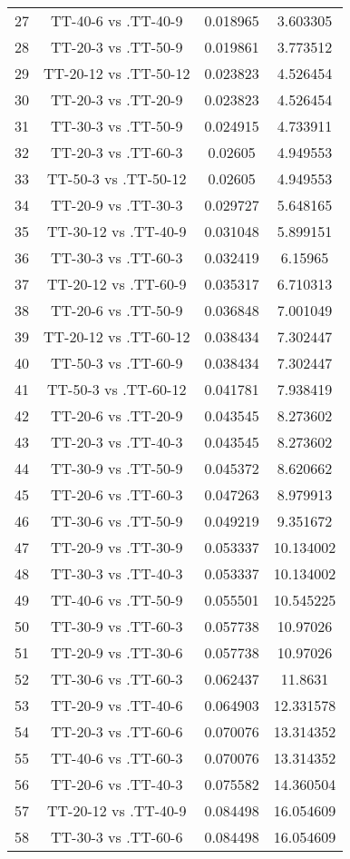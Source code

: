 \documentclass[a4paper,10pt]{article}
\begin{document}
\begin{landscape}
\begin{table}[!htp]
\begin{tabular}{cccc}
27&TT-40-6 vs .TT-40-9&0.018965&3.603305\\
28&TT-20-3 vs .TT-50-9&0.019861&3.773512\\
29&TT-20-12 vs .TT-50-12&0.023823&4.526454\\
30&TT-20-3 vs .TT-20-9&0.023823&4.526454\\
31&TT-30-3 vs .TT-50-9&0.024915&4.733911\\
32&TT-20-3 vs .TT-60-3&0.02605&4.949553\\
33&TT-50-3 vs .TT-50-12&0.02605&4.949553\\
34&TT-20-9 vs .TT-30-3&0.029727&5.648165\\
35&TT-30-12 vs .TT-40-9&0.031048&5.899151\\
36&TT-30-3 vs .TT-60-3&0.032419&6.15965\\
37&TT-20-12 vs .TT-60-9&0.035317&6.710313\\
38&TT-20-6 vs .TT-50-9&0.036848&7.001049\\
39&TT-20-12 vs .TT-60-12&0.038434&7.302447\\
40&TT-50-3 vs .TT-60-9&0.038434&7.302447\\
41&TT-50-3 vs .TT-60-12&0.041781&7.938419\\
42&TT-20-6 vs .TT-20-9&0.043545&8.273602\\
43&TT-20-3 vs .TT-40-3&0.043545&8.273602\\
44&TT-30-9 vs .TT-50-9&0.045372&8.620662\\
45&TT-20-6 vs .TT-60-3&0.047263&8.979913\\
46&TT-30-6 vs .TT-50-9&0.049219&9.351672\\
47&TT-20-9 vs .TT-30-9&0.053337&10.134002\\
48&TT-30-3 vs .TT-40-3&0.053337&10.134002\\
49&TT-40-6 vs .TT-50-9&0.055501&10.545225\\
50&TT-30-9 vs .TT-60-3&0.057738&10.97026\\
51&TT-20-9 vs .TT-30-6&0.057738&10.97026\\
52&TT-30-6 vs .TT-60-3&0.062437&11.8631\\
53&TT-20-9 vs .TT-40-6&0.064903&12.331578\\
54&TT-20-3 vs .TT-60-6&0.070076&13.314352\\
55&TT-40-6 vs .TT-60-3&0.070076&13.314352\\
56&TT-20-6 vs .TT-40-3&0.075582&14.360504\\
57&TT-20-12 vs .TT-40-9&0.084498&16.054609\\
58&TT-30-3 vs .TT-60-6&0.084498&16.054609\\

\end{tabular}
\end{table}
\end{landscape}
\end{document}
